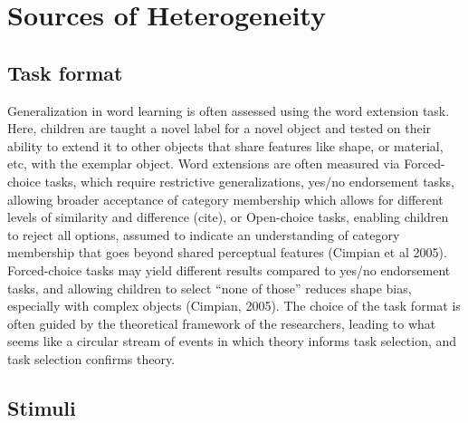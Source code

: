 \documentclass[10pt, letterpaper]{article}
\begin{document}
\hypertarget{sources-of-heterogeneity}{%
\section{Sources of Heterogeneity}\label{sources-of-heterogeneity}}

\hypertarget{task-format}{%
\subsection{Task format}\label{task-format}}

Generalization in word learning is often assessed using the word
extension task. Here, children are taught a novel label for a novel
object and tested on their ability to extend it to other objects that
share features like shape, or material, etc, with the exemplar object.
Word extensions are often measured via Forced-choice tasks, which
require restrictive generalizations, yes/no endorsement tasks, allowing
broader acceptance of category membership which allows for different
levels of similarity and difference (cite), or Open-choice tasks,
enabling children to reject all options, assumed to indicate an
understanding of category membership that goes beyond shared perceptual
features (Cimpian et al 2005). Forced-choice tasks may yield different
results compared to yes/no endorsement tasks, and allowing children to
select ``none of those'' reduces shape bias, especially with complex
objects (Cimpian, 2005). The choice of the task format is often guided
by the theoretical framework of the researchers, leading to what seems
like a circular stream of events in which theory informs task selection,
and task selection confirms theory.

\hypertarget{stimuli}{%
\subsection{Stimuli}\label{stimuli}}
\end{document}
